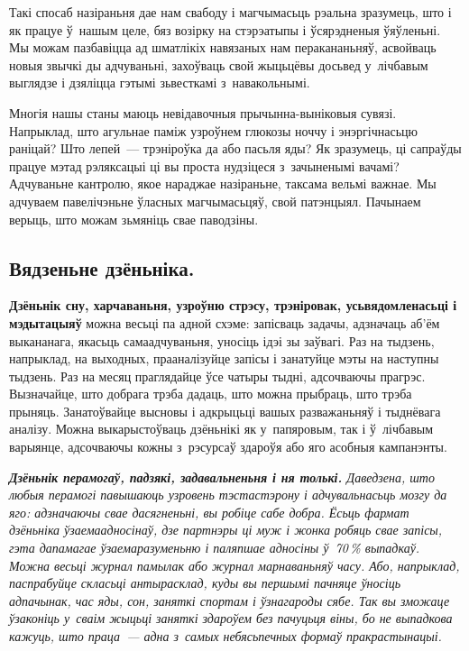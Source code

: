 Такі спосаб назіраньня дае нам свабоду і магчымасьць рэальна зразумець, што і як працуе ў~нашым целе, бяз возірку на стэрэатыпы і ўсярэдненыя ўяўленьні. Мы можам пазбавіцца ад шматлікіх навязаных нам перакананьняў, асвойваць новыя звычкі ды адчуваньні, захоўваць свой жыцьцёвы досьвед у~лічбавым выглядзе і дзяліцца гэтымі зьвесткамі з~навакольнымі.

Многія нашы станы маюць невідавочныя прычынна-выніковыя сувязі. Напрыклад, што агульнае паміж узроўнем глюкозы ноччу і энэргічнасьцю раніцай? Што лепей~--- трэніроўка да або пасьля яды? Як зразумець, ці сапраўды працуе мэтад рэляксацыі ці вы проста нудзіцеся з~зачыненымі вачамі? Адчуваньне кантролю, якое нараджае назіраньне, таксама вельмі важнае. Мы адчуваем павелічэньне ўласных магчымасьцяў, свой патэнцыял. Пачынаем верыць, што можам зьмяніць свае паводзіны. 


\subsection*{Вядзеньне дзёньніка.}

\textbf{Дзёньнік сну, харчаваньня, узроўню стрэсу, трэніровак, усьвядомленасьці і мэдытацыяў} можна весьці па адной схэме: запісваць задачы, адзначаць аб'ём выкананага, якасьць самаадчуваньня, уносіць ідэі зы заўвагі. Раз на тыдзень, напрыклад, на выходных, прааналізуйце запісы і занатуйце мэты на наступны тыдзень. Раз на месяц праглядайце ўсе чатыры тыдні, адсочваючы прагрэс. Вызначайце, што добрага трэба дадаць, што можна прыбраць, што трэба прыняць. Занатоўвайце высновы і адкрыцьці вашых разважаньняў і тыднёвага аналізу. Можна выкарыстоўваць дзёньнікі як у~папяровым, так і ў~лічбавым варыянце, адсочваючы кожны з~рэсурсаў здароўя або яго асобныя кампанэнты.

\emph{\textbf{Дзёньнік перамогаў, падзякі, задавальненьня і ня толькі.} Даведзена, што любыя перамогі павышаюць узровень тэстастэрону і адчувальнасьць мозгу да яго: адзначаючы свае дасягненьні, вы робіце сабе добра. Ёсьць фармат дзёньніка ўзаемаадносінаў, дзе партнэры ці муж і жонка робяць свае запісы, гэта дапамагае ўзаемаразуменьню і паляпшае адносіны ў~70\,\% выпадкаў. Можна весьці журнал памылак або журнал марнаваньняў часу. Або, напрыклад, паспрабуйце скласьці антырасклад, куды вы першымі пачняце ўносіць адпачынак, час яды, сон, заняткі спортам і ўзнагароды сябе. Так вы зможаце ўзаконіць у~сваім жыцьці заняткі здароўем без пачуцьця віны, бо не выпадкова кажуць, што праца~--- адна з~самых небясьпечных формаў пракрастынацыі.}

